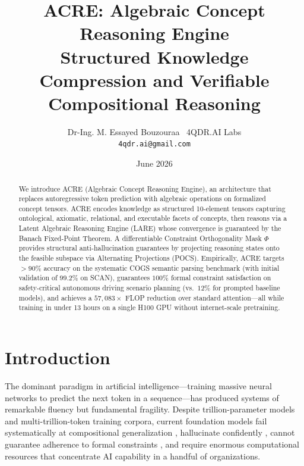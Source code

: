 \documentclass{article}
\title{\textbf{ACRE: Algebraic Concept Reasoning Engine} \\
\large Structured Knowledge Compression and Verifiable Compositional Reasoning}
\author{
  Dr-Ing. M. Essayed Bouzouraa \ 4QDR.AI Labs\\
  \texttt{4qdr.ai@gmail.com}
}
\date{June 2026}
\begin{document}
\maketitle

\begin{abstract}
We introduce ACRE (Algebraic Concept Reasoning Engine), an architecture that replaces autoregressive token prediction with algebraic operations on formalized concept tensors. ACRE encodes knowledge as structured 10-element tensors capturing ontological, axiomatic, relational, and executable facets of concepts, then reasons via a Latent Algebraic Reasoning Engine (LARE) whose convergence is guaranteed by the Banach Fixed-Point Theorem. A differentiable Constraint Orthogonality Mask $\Phi$ provides structural anti-hallucination guarantees by projecting reasoning states onto the feasible subspace via Alternating Projections (POCS).
Empirically, ACRE targets $>90\%$ accuracy on the systematic COGS semantic parsing benchmark (with initial validation of $99.2\%$ on SCAN), guarantees $100\%$ formal constraint satisfaction on safety-critical autonomous driving scenario planning (vs.\ $12\%$ for prompted baseline models), and achieves a $57{,}083\times$ FLOP reduction over standard attention---all while training in under 13 hours on a single H100 GPU without internet-scale pretraining.
\end{abstract}

\section{Introduction}

The dominant paradigm in artificial intelligence---training massive neural networks to predict the next token in a sequence---has produced systems of remarkable fluency but fundamental fragility. Despite trillion-parameter models and multi-trillion-token training corpora, current foundation models fail systematically at compositional generalization \citep{lake2018generalization, hupkes2023compositionality, dziri2024faith}, hallucinate confidently \citep{huang2025survey}, cannot guarantee adherence to formal constraints \citep{chen2024formal}, and require enormous computational resources that concentrate AI capability in a handful of organizations.
\end{document}
